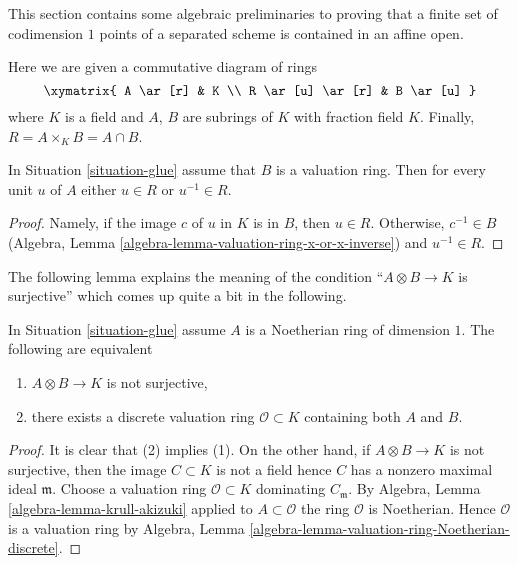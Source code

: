 \noindent
This section contains some algebraic preliminaries to proving that
a finite set of codimension $1$ points of a separated scheme is
contained in an affine open.

\begin{situation}
\label{situation-glue}
Here we are given a commutative diagram of rings
$$
\xymatrix{
A \ar[r] & K \\
R \ar[u] \ar[r] & B \ar[u]
}
$$
where $K$ is a field and $A$, $B$ are subrings of $K$ with fraction
field $K$. Finally, $R = A \times_K B = A \cap B$.
\end{situation}

\begin{lemma}
\label{lemma-glue-valuation-ring}
In Situation \ref{situation-glue} assume that $B$ is a valuation ring.
Then for every unit $u$ of $A$ either $u \in R$ or $u^{-1} \in R$.
\end{lemma}

\begin{proof}
Namely, if the image $c$ of $u$ in $K$ is in $B$, then $u \in R$.
Otherwise, $c^{-1} \in B$
(Algebra, Lemma \ref{algebra-lemma-valuation-ring-x-or-x-inverse})
and $u^{-1} \in R$.
\end{proof}

\noindent
The following lemma explains the meaning of the condition
``$A \otimes B \to K$ is surjective'' which comes up quite
a bit in the following.

\begin{lemma}
\label{lemma-glue-separated}
In Situation \ref{situation-glue} assume $A$ is a Noetherian
ring of dimension $1$. The following are equivalent
\begin{enumerate}
\item $A \otimes B \to K$ is not surjective,
\item there exists a discrete valuation ring $\mathcal{O} \subset K$
containing both $A$ and $B$.
\end{enumerate}
\end{lemma}

\begin{proof}
It is clear that (2) implies (1). On the other hand, if $A \otimes B \to K$
is not surjective, then the image $C \subset K$ is not a field hence
$C$ has a nonzero maximal ideal $\mathfrak m$. Choose a valuation ring
$\mathcal{O} \subset K$ dominating $C_\mathfrak m$. By
Algebra, Lemma \ref{algebra-lemma-krull-akizuki} applied to
$A \subset \mathcal{O}$ the ring $\mathcal{O}$ is Noetherian.
Hence $\mathcal{O}$ is a valuation ring by
Algebra, Lemma \ref{algebra-lemma-valuation-ring-Noetherian-discrete}.
\end{proof}

